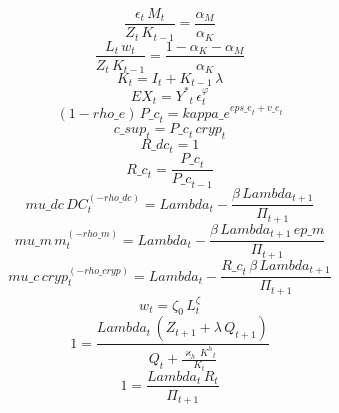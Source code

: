 \begin{dmath}
\frac{{\epsilon}_{t}\, {M}_{t}}{{Z}_{t}\, {K}_{t-1}}=\frac{{\alpha_{M}}}{{\alpha_{K}}}
\end{dmath}
\begin{dmath}
\frac{{L}_{t}\, {w}_{t}}{{Z}_{t}\, {K}_{t-1}}=\frac{1-{\alpha_{K}}-{\alpha_{M}}}{{\alpha_{K}}}
\end{dmath}
\begin{dmath}
{K}_{t}={I}_{t}+{K}_{t-1}\, {\lambda}
\end{dmath}
\begin{dmath}
{EX}_{t}={Y^{*}}_{t}\, {\epsilon}_{t}^{{\varphi}}
\end{dmath}
\begin{dmath}
\left(1-{rho\_e}\right)\, {P\_c}_{t}={kappa\_e}^{{eps\_e}_{t}+{v\_e}_{t}}
\end{dmath}
\begin{dmath}
{c\_sup}_{t}={P\_c}_{t}\, {cryp}_{t}
\end{dmath}
\begin{dmath}
{R\_dc}_{t}=1
\end{dmath}
\begin{dmath}
{R\_c}_{t}=\frac{{P\_c}_{t}}{{P\_c}_{t-1}}
\end{dmath}
\begin{dmath}
{mu\_dc}\, {DC}_{t}^{\left(-{rho\_dc}\right)}={Lambda}_{t}-\frac{{\beta}\, {Lambda}_{t+1}}{{\Pi}_{t+1}}
\end{dmath}
\begin{dmath}
{mu\_m}\, {m}_{t}^{\left(-{rho\_m}\right)}={Lambda}_{t}-\frac{{\beta}\, {Lambda}_{t+1}\, {ep\_m}}{{\Pi}_{t+1}}
\end{dmath}
\begin{dmath}
{mu\_c}\, {cryp}_{t}^{\left(-{rho\_cryp}\right)}={Lambda}_{t}-\frac{{R\_c}_{t}\, {\beta}\, {Lambda}_{t+1}}{{\Pi}_{t+1}}
\end{dmath}
\begin{dmath}
{w}_{t}={\zeta_{0}}\, {L}_{t}^{{\zeta}}
\end{dmath}
\begin{dmath}
1=\frac{{Lambda}_{t}\, \left({Z}_{t+1}+{\lambda}\, {Q}_{t+1}\right)}{{Q}_{t}+\frac{{\varkappa_{h}}\, {K^{h}}_{t}}{{K}_{t}}}
\end{dmath}
\begin{dmath}
1=\frac{{Lambda}_{t}\, {R}_{t}}{{\Pi}_{t+1}}
\end{dmath}

